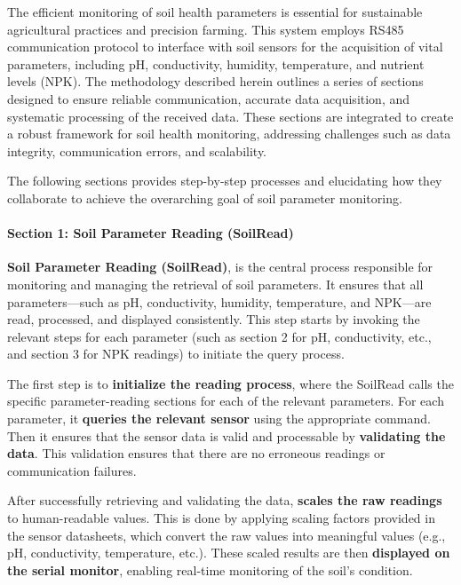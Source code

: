 \documentclass{book} %
\begin{document}
\noindent The efficient monitoring of soil health parameters is essential for sustainable agricultural practices and precision farming. This system employs RS485 communication protocol to interface with soil sensors for the acquisition of vital parameters, including pH, conductivity, humidity, temperature, and nutrient levels (NPK). The methodology described herein outlines a series of sections designed to ensure reliable communication, accurate data acquisition, and systematic processing of the received data. These sections are integrated to create a robust framework for soil health monitoring, addressing challenges such as data integrity, communication errors, and scalability.

\noindent The following sections provides step-by-step processes and elucidating how they collaborate to achieve the overarching goal of soil parameter monitoring.

\noindent 
\paragraph{Section 1: Soil Parameter Reading (SoilRead)}

\noindent \textbf{Soil Parameter Reading (SoilRead)}, is the central process responsible for monitoring and managing the retrieval of soil parameters. It ensures that all parameters---such as pH, conductivity, humidity, temperature, and NPK---are read, processed, and displayed consistently. This step starts by invoking the relevant steps for each parameter (such as section 2 for pH, conductivity, etc., and section 3 for NPK readings) to initiate the query process.

\noindent The first step is to \textbf{initialize the reading process}, where the SoilRead calls the specific parameter-reading sections for each of the relevant parameters. For each parameter, it \textbf{queries the relevant sensor} using the appropriate command. Then it ensures that the sensor data is valid and processable by \textbf{validating the data}. This validation ensures that there are no erroneous readings or communication failures.

\noindent After successfully retrieving and validating the data, \textbf{scales the raw readings} to human-readable values. This is done by applying scaling factors provided in the sensor datasheets, which convert the raw values into meaningful values (e.g., pH, conductivity, temperature, etc.). These scaled results are then \textbf{displayed on the serial monitor}, enabling real-time monitoring of the soil's condition.
\end{document}
